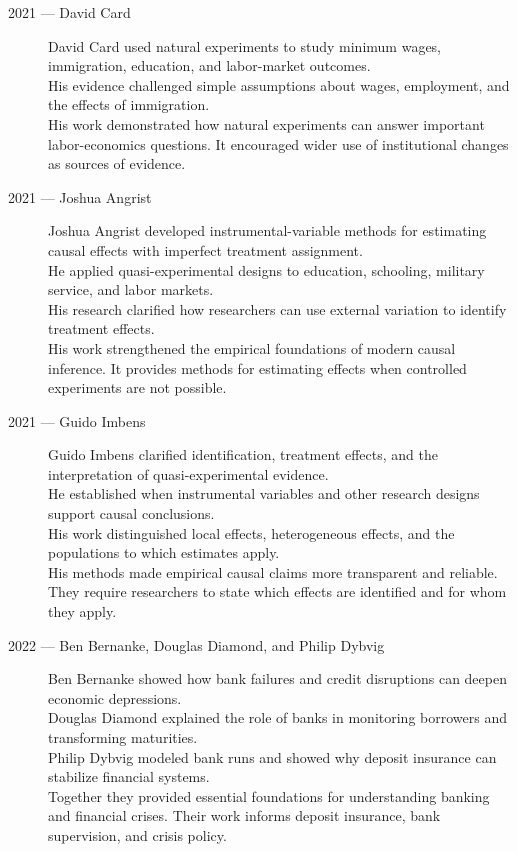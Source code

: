 \documentclass[12pt]{report}
\begin{document}
{\begin{description}
\item[2021 --- David Card]
David Card used natural experiments to study minimum wages, immigration, education, and labor-market outcomes.\\
His evidence challenged simple assumptions about wages, employment, and the effects of immigration.\\
His work demonstrated how natural experiments can answer important labor-economics questions. It encouraged wider use of institutional changes as sources of evidence.

\item[2021 --- Joshua Angrist]
Joshua Angrist developed instrumental-variable methods for estimating causal effects with imperfect treatment assignment.\\
He applied quasi-experimental designs to education, schooling, military service, and labor markets.\\
His research clarified how researchers can use external variation to identify treatment effects.\\
His work strengthened the empirical foundations of modern causal inference. It provides methods for estimating effects when controlled experiments are not possible.

\item[2021 --- Guido Imbens]
Guido Imbens clarified identification, treatment effects, and the interpretation of quasi-experimental evidence.\\
He established when instrumental variables and other research designs support causal conclusions.\\
His work distinguished local effects, heterogeneous effects, and the populations to which estimates apply.\\
His methods made empirical causal claims more transparent and reliable. They require researchers to state which effects are identified and for whom they apply.

\item[2022 --- Ben Bernanke, Douglas Diamond, and Philip Dybvig]
Ben Bernanke showed how bank failures and credit disruptions can deepen economic depressions.\\
Douglas Diamond explained the role of banks in monitoring borrowers and transforming maturities.\\
Philip Dybvig modeled bank runs and showed why deposit insurance can stabilize financial systems.\\
Together they provided essential foundations for understanding banking and financial crises. Their work informs deposit insurance, bank supervision, and crisis policy.


\end{description}}
\end{document}
